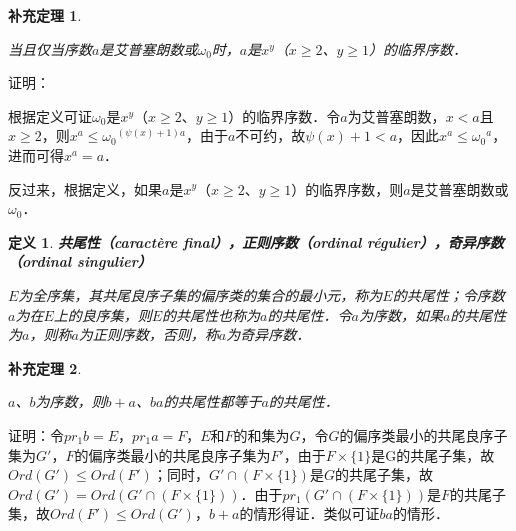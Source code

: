 \documentclass[12pt, a4paper, oneside]{book}
\newtheorem{cor}{补充定理}
\newtheorem{de}{定义}
\begin{document}
			\begin{cor}\label{cor369}
				\hfill\par
				当且仅当序数$a$是艾普塞朗数或$\omega_0$时，$a$是$x^y$（$x\geq 2$、$y\geq 1$）的临界序数．
			\end{cor}
			证明：
			\par
			根据定义可证$\omega_0$是$x^y$（$x\geq 2$、$y\geq 1$）的临界序数．令$a$为艾普塞朗数，$x<a$且$x\geq 2$，则$x^a\leq {\omega_0}^{(\psi(x)+1)a}$，由于$a$不可约，故$\psi(x)+1<a$，因此$x^a\leq {\omega_0}^a$，进而可得$x^a=a$．
			\par
			反过来，根据定义，如果$a$是$x^y$（$x\geq 2$、$y\geq 1$）的临界序数，则$a$是艾普塞朗数或$\omega_0$．
			
			\begin{de}
				\textbf{共尾性（caractère final），正则序数（ordinal régulier），奇异序数\\（ordinal singulier）}
				\par
				$E$为全序集，其共尾良序子集的偏序类的集合的最小元，称为$E$的共尾性；令序数$a$为在$E$上的良序集，则$E$的共尾性也称为$a$的共尾性．令$a$为序数，如果$a$的共尾性为$a$，则称$a$为正则序数，否则，称$a$为奇异序数．
			\end{de}
			
			\begin{cor}\label{cor370}
				\hfill\par
				$a$、$b$为序数，则$b+a$、$ba$的共尾性都等于$a$的共尾性．
			\end{cor}
			证明：令$pr_1b=E$，$pr_1a=F$，$E$和$F$的和集为$G$，令$G$的偏序类最小的共尾良序子集为$G'$，$F$的偏序类最小的共尾良序子集为$F'$，由于$F\times \{1\}$是G的共尾子集，故$Ord(G')\leq Ord(F')$；同时，$G'\cap(F\times \{1\})$是$G$的共尾子集，故$Ord(G')= Ord(G'\cap(F\times \{1\}))$．由于$pr_1(G'\cap(F\times \{1\}))$是$F$的共尾子集，故$Ord(F')\leq Ord(G')$，$b+a$的情形得证．类似可证$ba$的情形．
			
\end{document}
